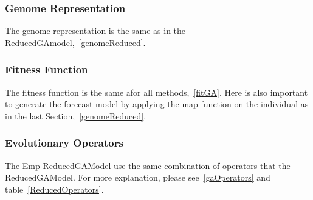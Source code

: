 \subsubsection{Genome Representation}
The genome representation is the same as in the ReducedGAmodel,~\ref{genomeReduced}. \\

\subsubsection{Fitness Function}
The fitness function is the same afor all methods,~\ref{fitGA}. Here is also important to generate the forecast model by applying the map function on the individual as in the last Section,~\ref{genomeReduced}.\\

\subsubsection{Evolutionary Operators}
The Emp-ReducedGAModel use the same combination of operators that the ReducedGAModel. For more explanation, please see~\ref{gaOperators} and table~\ref{ReducedOperators}.\\

